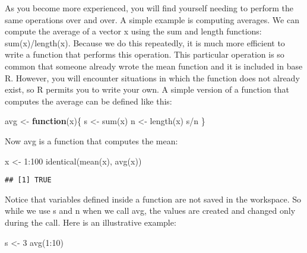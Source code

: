 \documentclass[
]{article}
\newenvironment{Shaded}{\begin{snugshade}}{\end{snugshade}}
\newcommand{\ControlFlowTok}[1]{\textcolor[rgb]{0.13,0.29,0.53}{\textbf{#1}}}
\newcommand{\DecValTok}[1]{\textcolor[rgb]{0.00,0.00,0.81}{#1}}
\newcommand{\FunctionTok}[1]{\textcolor[rgb]{0.00,0.00,0.00}{#1}}
\newcommand{\NormalTok}[1]{#1}
\newcommand{\OtherTok}[1]{\textcolor[rgb]{0.56,0.35,0.01}{#1}}
\newcommand{\SpecialCharTok}[1]{\textcolor[rgb]{0.00,0.00,0.00}{#1}}
\begin{document}
As you become more experienced, you will find yourself needing to
perform the same operations over and over. A simple example is computing
averages. We can compute the average of a vector x using the sum and
length functions: sum(x)/length(x). Because we do this repeatedly, it is
much more efficient to write a function that performs this operation.
This particular operation is so common that someone already wrote the
mean function and it is included in base R. However, you will encounter
situations in which the function does not already exist, so R permits
you to write your own. A simple version of a function that computes the
average can be defined like this:

\begin{Shaded}
\begin{Highlighting}[]
\NormalTok{avg }\OtherTok{\textless{}{-}} \ControlFlowTok{function}\NormalTok{(x)\{}
\NormalTok{  s }\OtherTok{\textless{}{-}} \FunctionTok{sum}\NormalTok{(x)}
\NormalTok{  n }\OtherTok{\textless{}{-}} \FunctionTok{length}\NormalTok{(x)}
\NormalTok{  s}\SpecialCharTok{/}\NormalTok{n}
\NormalTok{\}}
\end{Highlighting}
\end{Shaded}

Now avg is a function that computes the mean:

\begin{Shaded}
\begin{Highlighting}[]
\NormalTok{x }\OtherTok{\textless{}{-}} \DecValTok{1}\SpecialCharTok{:}\DecValTok{100}
\FunctionTok{identical}\NormalTok{(}\FunctionTok{mean}\NormalTok{(x), }\FunctionTok{avg}\NormalTok{(x))}
\end{Highlighting}
\end{Shaded}

\begin{verbatim}
## [1] TRUE
\end{verbatim}

Notice that variables defined inside a function are not saved in the
workspace. So while we use s and n when we call avg, the values are
created and changed only during the call. Here is an illustrative
example:

\begin{Shaded}
\begin{Highlighting}[]
\NormalTok{s }\OtherTok{\textless{}{-}} \DecValTok{3}
\FunctionTok{avg}\NormalTok{(}\DecValTok{1}\SpecialCharTok{:}\DecValTok{10}\NormalTok{)}
\end{Highlighting}
\end{Shaded}
\end{document}

